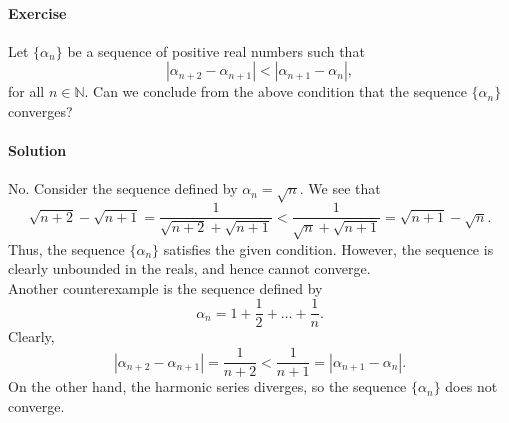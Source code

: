 \documentclass[10pt]{article}
\newcounter{prob}
\def\problem{\stepcounter{prob}\paragraph{Exercise \arabic{prob}}}
\def\solution{\paragraph{Solution}}
\begin{document}
        \problem Let $\{\alpha_n\}$ be a sequence of positive real numbers such that 
        \[
                |\alpha_{n + 2} - \alpha_{n + 1}| < |\alpha_{n + 1} - \alpha_n|,
        \]
        for all $n \in \mathbb{N}$. Can we conclude from the above condition that the sequence $\{\alpha_n\}$ converges?

        \solution No. Consider the sequence defined by $\alpha_n = \sqrt{n}$. We see that
        \[
                \sqrt{n + 2} - \sqrt{n + 1} = \frac{1}{\sqrt{n + 2} + \sqrt{n + 1}} < \frac{1}{\sqrt{n} + \sqrt{n + 1}} = \sqrt{n + 1} - \sqrt{n}.
        \]
        Thus, the sequence $\{\alpha_n\}$ satisfies the given condition. However, the sequence is clearly unbounded in the reals, and
        hence cannot converge. \\

        Another counterexample is the sequence defined by
        \[
                \alpha_n = 1 + \frac{1}{2} + \dots + \frac{1}{n}.
        \]
        Clearly, 
        \[
                |\alpha_{n + 2} - \alpha_{n + 1}| = \frac{1}{n + 2} < \frac{1}{n + 1} = |\alpha_{n + 1} - \alpha_n|.
        \]
        On the other hand, the harmonic series diverges, so the sequence $\{\alpha_n\}$ does not converge.
\end{document}
